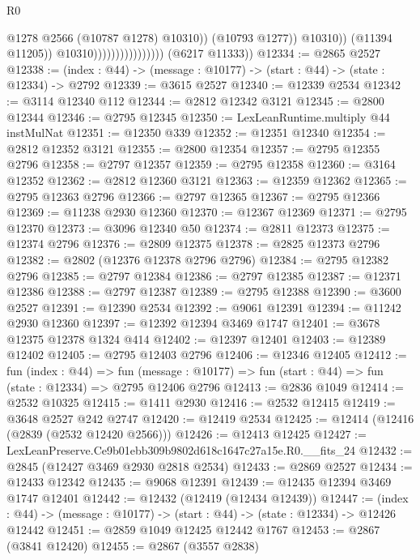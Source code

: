 \begin{lexlean}{R0}
\begin{coremodule}
                                                  @1278
                                                  @2566
                                                  (@10787 @1278)
                                                  @10310))
                                              (@10793 @1277))
                                            @10310))
                                        (@11394 @11205))
                                      @10310))))))))))))))))
      (@6217 @11333))
@12334 := @2865 @2527
@12338 := (index : @44) -> (message : @10177) -> (start : @44) -> (state : @12334) -> @2792
@12339 := @3615 @2527
@12340 := @12339 @2534
@12342 := @3114 @12340 @112
@12344 := @2812 @12342 @3121
@12345 := @2800 @12344
@12346 := @2795 @12345
@12350 := LexLeanRuntime.multiply @44 instMulNat
@12351 := @12350 @339
@12352 := @12351 @12340
@12354 := @2812 @12352 @3121
@12355 := @2800 @12354
@12357 := @2795 @12355 @2796
@12358 := @2797 @12357
@12359 := @2795 @12358
@12360 := @3164 @12352
@12362 := @2812 @12360 @3121
@12363 := @12359 @12362
@12365 := @2795 @12363 @2796
@12366 := @2797 @12365
@12367 := @2795 @12366
@12369 := @11238 @2930 @12360
@12370 := @12367 @12369
@12371 := @2795 @12370
@12373 := @3096 @12340 @50
@12374 := @2811 @12373
@12375 := @12374 @2796
@12376 := @2809 @12375
@12378 := @2825 @12373 @2796
@12382 := @2802 (@12376 @12378 @2796 @2796)
@12384 := @2795 @12382 @2796
@12385 := @2797 @12384
@12386 := @2797 @12385
@12387 := @12371 @12386
@12388 := @2797 @12387
@12389 := @2795 @12388
@12390 := @3600 @2527
@12391 := @12390 @2534
@12392 := @9061 @12391
@12394 := @11242 @2930 @12360
@12397 := @12392 @12394 @3469 @1747
@12401 := @3678 @12375 @12378 @1324 @414
@12402 := @12397 @12401
@12403 := @12389 @12402
@12405 := @2795 @12403 @2796
@12406 := @12346 @12405
@12412 := fun (index : @44) =>
  fun (message : @10177) => fun (start : @44) => fun (state : @12334) => @2795 @12406 @2796
@12413 := @2836 @1049
@12414 := @2532 @10325
@12415 := @1411 @2930
@12416 := @2532 @12415
@12419 := @3648 @2527 @242 @2747
@12420 := @12419 @2534
@12425 := @12414 (@12416 (@2839 (@2532 @12420 @2566)))
@12426 := @12413 @12425
@12427 := LexLeanPreserve.Ce9b01ebb309b9802d618c1647c27a15e.R0.__fits_24
@12432 := @2845 (@12427 @3469 @2930 @2818 @2534)
@12433 := @2869 @2527
@12434 := @12433 @12342
@12435 := @9068 @12391
@12439 := @12435 @12394 @3469 @1747 @12401
@12442 := @12432 (@12419 (@12434 @12439))
@12447 := (index : @44) -> (message : @10177) -> (start : @44) -> (state : @12334) -> @12426 @12442
@12451 := @2859 @1049 @12425 @12442 @1767
@12453 := @2867 (@3841 @12420)
@12455 := @2867 (@3557 @2838)

\end{coremodule}
\end{lexlean}
